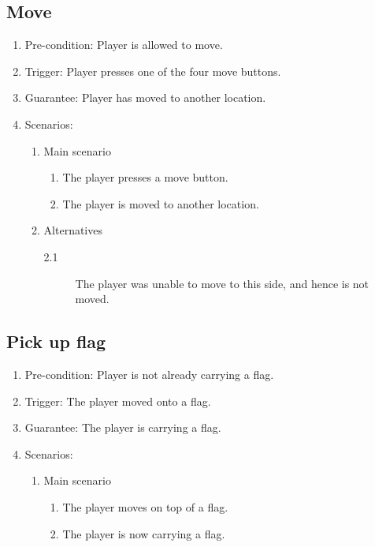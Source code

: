 \documentclass[a4paper,twoside,11pt]{article}
\begin{document}
\subsection*{Move}
\begin{enumerate}
\item Pre-condition: Player is allowed to move.
\item Trigger: Player presses one of the four move buttons.
\item Guarantee: Player has moved to another location.
\item Scenarios: 
	\begin{enumerate}
	\item Main scenario
		\begin{enumerate}[1)]
		\item The player presses a move button.
		\item The player is moved to another location.
		\end{enumerate}
	\item Alternatives
		\begin{description}
		\item[2.1] The player was unable to move to this side, and 		         hence is not moved.
		\end{description}
	\end{enumerate}
\end{enumerate}
\subsection*{Pick up flag}
\begin{enumerate}
\item Pre-condition: Player is not already carrying a flag.
\item Trigger: The player moved onto a flag.
\item Guarantee: The player is carrying a flag.
\item Scenarios: 
	\begin{enumerate}
	\item Main scenario
		\begin{enumerate}[1)]
		\item The player moves on top of a flag.
		\item The player is now carrying a flag.
		\end{enumerate}
	\end{enumerate}
\end{enumerate}
\end{document}
